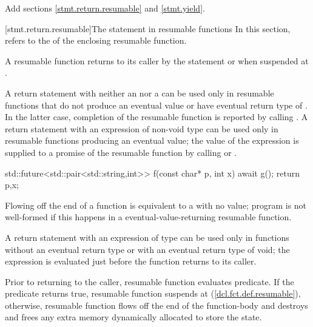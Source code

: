 Add sections \ref{stmt.return.resumable} and \ref{stmt.yield}.

[stmt.return.resumable]{The  statement in resumable functions}%
\enternote
In this section,  refers to the 
of the enclosing resumable function.
\exitnote

\pnum
A resumable function returns to its caller by the  statement
or when suspended at .

\pnum
A return statement
with neither an  nor a 
can be used only in resumable functions
that do not produce an eventual value or have eventual return type of . In the latter case, completion of the resumable function
is reported by calling .
A return statement with an expression of non-void type can be used only
in resumable functions producing an eventual value; the value of the expression is supplied to a promise of the resumable function by calling 
 or
.

\enterexample

\begin{codeblock}
	std::future<std::pair<std::string,int>> f(const char* p, int x) {
		await g();
		return {p,x};
	}
\end{codeblock}
\exitexample

Flowing off the end of a function is equivalent to a  with
no value; program is not well-formed if this happens in a eventual-value-returning resumable function.

\pnum
A return statement with an expression of type 
can be used only in functions without an eventual return type 
or with an eventual return type of void; the expression is evaluated just before the function
returns to its caller.

\pnum
Prior to returning to the caller, resumable function evaluates
 predicate. If the predicate returns
true, resumable function suspends at  (\ref{dcl.fct.def.resumable}),
otherwise, resumable function flows off the end of the function-body and destroys  and frees any extra memory dynamically allocated to store the state.

